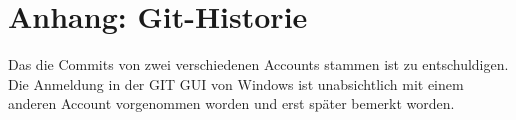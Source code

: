 \documentclass[usegeometry=true]{scrartcl}
\begin{document}

\newpage

\setcounter{page}{4}
\section*{Anhang: Git-Historie}
Das die Commits von zwei verschiedenen Accounts stammen ist zu entschuldigen. Die Anmeldung in der GIT GUI von Windows ist unabsichtlich mit einem anderen Account vorgenommen worden und erst später bemerkt worden.
\end{document}
